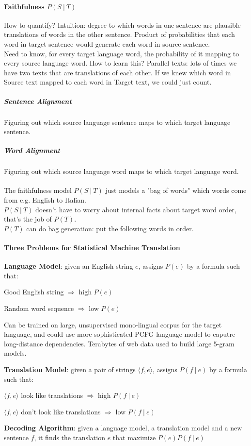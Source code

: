\documentclass[10pt]{report}
\begin{document}
\paragraph{Faithfulness $P(S\:|\:T)$} How to quantify? Intuition: degree to which words in one sentence are plausible translations of words in the other sentence. Product of probabilities that each word in target sentence would generate each word in source sentence.\\
Need to know, for every target language word, the probability of it mapping to every source language word. How to learn this? Parallel texts: lots of times we have two texts that are translations of each other. If we knew which word in Source text mapped to each word in Target text, we could just count.
\subparagraph{Sentence Alignment} Figuring out which source language sentence maps to which target language sentence.
\subparagraph{Word Alignment} Figuring out which source language word maps to which target language word. \\\\
The faithfulness model $P(S\:|\:T)$ just models a "bag of words" which words come from e.g. English to Italian.\\
$P(S\:|\:T)$ doesn't have to worry about internal facts about target word order, that's the job of $P(T)$.\\
$P(T)$ can do bag generation: put the following words in order.
\paragraph{Three Problems for Statistical Machine Translation}
\begin{list}{}{}
	\item \textbf{Language Model}: given an English string $e$, assigns $P(e)$ by a formula such that:
	\begin{list}{}{}
		\item Good English string $\Rightarrow$ high $P(e)$
		\item Random word sequence $\Rightarrow$ low $P(e)$
	\end{list}
	Can be trained on large, unsupervised mono-lingual corpus for the target language, and could use more sophisticated PCFG language model to caputre long-distance dependencies. Terabytes of web data used to build large 5-gram models.
	\item \textbf{Translation Model}: given a pair of strings $\langle f,e\rangle$, assigns $P(f\:|\:e)$ by a formula such that:
	\begin{list}{}{}
		\item $\langle f,e\rangle$ look like translations $\Rightarrow$ high $P(f\:|\:e)$
		\item $\langle f,e\rangle$ don't look like translations $\Rightarrow$ low $P(f\:|\:e)$
	\end{list}
	\item \textbf{Decoding Algorithm}: given a language model, a translation model and a new sentence $f$, it finds the translation $e$ that maximize $P(e)P(f\:|\:e)$
\end{list}
\end{document}
